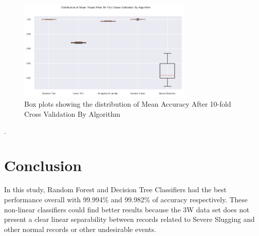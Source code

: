\documentclass{article}
\begin{document}
\begin{figure}
\centering
\includegraphics[width=0.75\textwidth]{10_fold_rec.png}
\caption{\label{fig:10_fold_rec}Box plots showing the distribution of Mean Accuracy After 10-fold Cross Validation By Algorithm}
\end{figure}.


\section{Conclusion}

In this study, Random Forest and Decision Tree Classifiers had the best performance overall with 99.994\% and 99.982\% of accuracy respectively. These non-linear classifiers could find better results because the 3W data set does not present a clear linear separability between records related to Severe Slugging and other normal records or other undesirable events.

\printbibliography
\end{document}
